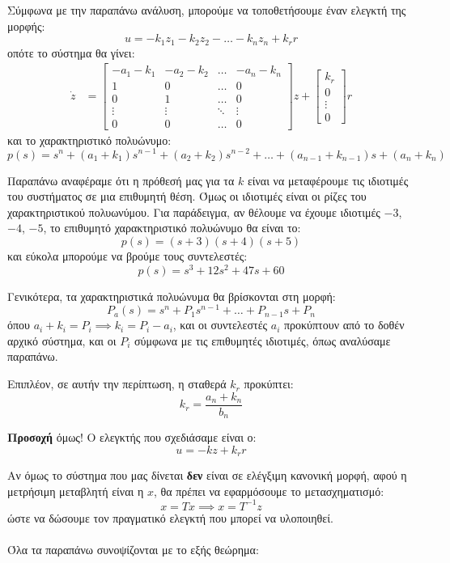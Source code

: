 \documentclass[11pt,a4paper,notitlepage,fleqn]{article}
\begin{document}
Σύμφωνα με την παραπάνω ανάλυση, μπορούμε να τοποθετήσουμε έναν
ελεγκτή της μορφής:
\[
u = -k_1 z_1 - k_2z_2 - \dots - k_nz_n + k_r r
\]
οπότε το σύστημα θα γίνει:
\begin{align*}
\dot z &= \left[\begin{matrix}
-a_1-k_1 & -a_2-k_2 & \hdots & -a_n-k_n \\
1 & 0 & \hdots & 0\\
0 & 1 & \hdots & 0 \\
\vdots & \vdots & \ddots &\vdots \\
0 & 0 & \hdots & 0
\end{matrix}\right]z + \left[\begin{matrix}
k_r \\ 0 \\ \vdots \\ 0
\end{matrix}\right]r
\end{align*}
και το χαρακτηριστικό πολυώνυμο:
\[
p(s) = s^n + (a_1+k_1)s^{n-1} + (a_2+k_2)s^{n-2} + \dots + (a_{n-1} + k_{n-1})s + (a_n+k_n)
\]

Παραπάνω αναφέραμε ότι η πρόθεσή μας για τα \( k \) είναι να μεταφέρουμε
τις ιδιοτιμές του συστήματος σε μια επιθυμητή θέση. Όμως οι ιδιοτιμές
είναι οι ρίζες του χαρακτηριστικού πολυωνύμου. Για παράδειγμα, αν θέλουμε
να έχουμε ιδιοτιμές \( -3 \), \( -4 \), \( -5 \), το επιθυμητό χαρακτηριστικό
πολυώνυμο θα είναι το:
\[
p(s) = (s+3)(s+4)(s+5)
\]
και εύκολα μπορούμε να βρούμε τους συντελεστές:
\[
p(s) = s^3 + 12s^2 + 47s + 60
\]

Γενικότερα, τα χαρακτηριστικά πολυώνυμα θα βρίσκονται στη μορφή:
\[
P_a(s) = s^n + P_1s^{n-1} + \dots + P_{n-1}s+P_n
\]
όπου \( a_i+k_i = P_i \implies k_i = P_i - a_i \), και οι συντελεστές
\( a_i \) προκύπτουν από το δοθέν αρχικό σύστημα, και οι \( P_i \)
σύμφωνα με τις επιθυμητές ιδιοτιμές, όπως αναλύσαμε παραπάνω.

Επιπλέον, σε αυτήν την περίπτωση, η σταθερά \( k_r \) προκύπτει:
\[
k_r = \frac{a_n+k_n}{b_n}
\]

\textbf{Προσοχή} όμως! Ο ελεγκτής που σχεδιάσαμε είναι ο:
\[
u = -kz +k_r r
\]

Αν όμως το σύστημα που μας δίνεται \textbf{δεν} είναι σε ελέγξιμη κανονική μορφή, αφού η μετρήσιμη μεταβλητή είναι η \( x \), θα πρέπει να εφαρμόσουμε
το μετασχηματισμό:
\[
x = Tx \implies x = T^{-1}z
\]
ώστε να δώσουμε τον πραγματικό ελεγκτή που μπορεί να υλοποιηθεί.

\paragraph{}
Όλα τα παραπάνω συνοψίζονται με το εξής θεώρημα:
\end{document}
